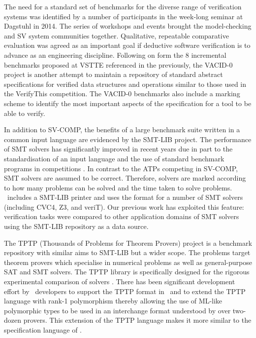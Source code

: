 The need for a standard set of benchmarks for the diverse range of verification systems was identified by a number of participants in the week-long seminar at Dagstuhl \cite{Dagstuhl} in 2014. The series of workshops and events brought the model-checking and SV system communities together. Qualitative, repeatable comparative evaluation was agreed as an important goal if deductive software verification is to advance as an engineering discipline. Following on form the 8 incremental benchmarks proposed at VSTTE referenced in the previously, the VACID-0 \cite{Leino10vacid-0:verification} project is another attempt to maintain a repository of standard abstract specifications for verified data structures and operations similar to those used in the VerifyThis competition. The VACID-0 benchmarks also include a marking scheme to identify the most important aspects of the specification for a tool to be able to verify.

In addition to SV-COMP, the benefits of a large benchmark suite written in a common input language are evidenced by the SMT-LIB \cite{SMTLIB} project. 
The performance of SMT solvers has significantly improved in recent years due in part to the standardisation of an input language and the use of standard benchmark programs in competitions \cite{SMTEVAL2013}. 
In contrast to the ATPs competing in SV-COMP, SMT solvers are assumed to be correct. Therefore, solvers are marked according to how many problems can be solved and the time taken to solve problems.
\why~includes a SMT-LIB printer and uses the format for a number of SMT solvers (including CVC4, Z3, and veriT). Our previous work \cite{Healy:2016} has exploited this feature: verification tasks were compared to other application domains of SMT solvers using the SMT-LIB repository as a data source.

The TPTP (Thousands of Problems for Theorem Provers) project \cite{TPTP} is a benchmark repository with similar aims to SMT-LIB but a wider scope. The problems target theorem provers which specialise in numerical problems as well as general-purpose SAT and SMT solvers. The TPTP library is specifically designed for the rigorous experimental comparison of solvers \cite{Sutcliffe200139}. There has been significant development effort by \why~developers to support the TPTP format in \why~and to extend the TPTP language with rank-1 polymorphism \cite{why:tptp} thereby allowing the use of ML-like polymorphic types to be used in an interchange format understood by over two-dozen provers. This extension of the TPTP language makes it more similar to the specification language of \why.   \\

